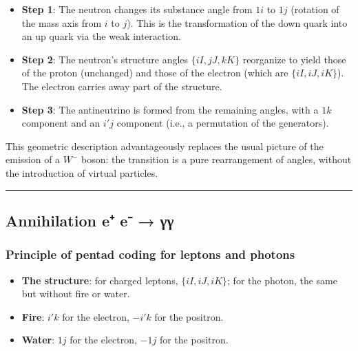 \documentclass[11pt]{article}
\providecommand{\tightlist}{%
\setlength{\itemsep}{2pt}\setlength{\parskip}{6pt}
}
\begin{document}
\begin{itemize}
\tightlist
\item
  \textbf{Step 1}: The neutron changes its substance angle from \(1i\)
  to \(1j\) (rotation of the mass axis from \(i\) to \(j\)). This is the
  transformation of the down quark into an up quark via the weak
  interaction.
\item
  \textbf{Step 2}: The neutron's structure angles \(\{iI, jJ, kK\}\)
  reorganize to yield those of the proton (unchanged) and those of the
  electron (which are \(\{iI, iJ, iK\}\)). The electron carries away
  part of the structure.
\item
  \textbf{Step 3}: The antineutrino is formed from the remaining angles,
  with a \(1k\) component and an \(i'j\) component (i.e., a permutation
  of the generators).
\end{itemize}

This geometric description advantageously replaces the usual picture of
the emission of a \(W^-\) boson: the transition is a pure rearrangement
of angles, without the introduction of virtual particles.

\begin{center}\rule{0.5\linewidth}{0.5pt}\end{center}

\hypertarget{annihilation-e-e-ux3b3ux3b3}{%
\subsection{Annihilation e⁺ e⁻ → γγ}\label{annihilation-e-e-ux3b3ux3b3}}

\hypertarget{principle-of-pentad-coding-for-leptons-and-photons}{%
\subsubsection{Principle of pentad coding for leptons and
photons}\label{principle-of-pentad-coding-for-leptons-and-photons}}

\begin{itemize}
\tightlist
\item
  \textbf{The structure}: for charged leptons, \(\{iI, iJ, iK\}\); for
  the photon, the same but without fire or water.
\item
  \textbf{Fire}: \(i'k\) for the electron, \(-i'k\) for the positron.
\item
  \textbf{Water}: \(1j\) for the electron, \(-1j\) for the positron.
\end{itemize}
\end{document}
